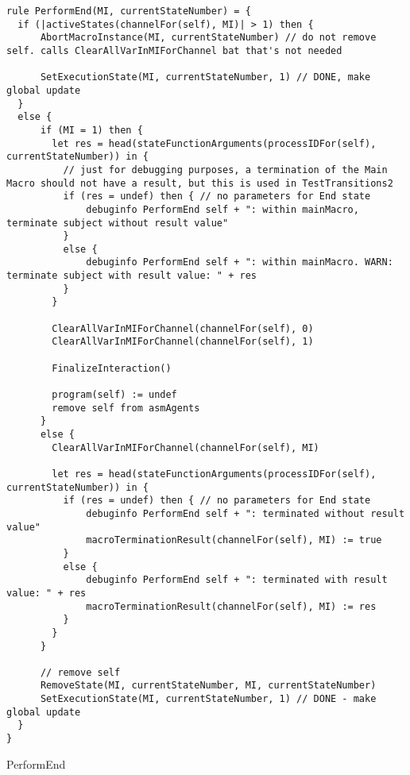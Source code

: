 \begin{listing}[H]
\begin{verbatim}
rule PerformEnd(MI, currentStateNumber) = {
  if (|activeStates(channelFor(self), MI)| > 1) then {
      AbortMacroInstance(MI, currentStateNumber) // do not remove self. calls ClearAllVarInMIForChannel bat that's not needed

      SetExecutionState(MI, currentStateNumber, 1) // DONE, make global update
  }
  else {
      if (MI = 1) then {
        let res = head(stateFunctionArguments(processIDFor(self), currentStateNumber)) in {
          // just for debugging purposes, a termination of the Main Macro should not have a result, but this is used in TestTransitions2
          if (res = undef) then { // no parameters for End state
              debuginfo PerformEnd self + ": within mainMacro, terminate subject without result value"
          }
          else {
              debuginfo PerformEnd self + ": within mainMacro. WARN: terminate subject with result value: " + res
          }
        }

        ClearAllVarInMIForChannel(channelFor(self), 0)
        ClearAllVarInMIForChannel(channelFor(self), 1)

        FinalizeInteraction()

        program(self) := undef
        remove self from asmAgents
      }
      else {
        ClearAllVarInMIForChannel(channelFor(self), MI)

        let res = head(stateFunctionArguments(processIDFor(self), currentStateNumber)) in {
          if (res = undef) then { // no parameters for End state
              debuginfo PerformEnd self + ": terminated without result value"
              macroTerminationResult(channelFor(self), MI) := true
          }
          else {
              debuginfo PerformEnd self + ": terminated with result value: " + res
              macroTerminationResult(channelFor(self), MI) := res
          }
        }
      }

      // remove self
      RemoveState(MI, currentStateNumber, MI, currentStateNumber)
      SetExecutionState(MI, currentStateNumber, 1) // DONE - make global update
  }
}
\end{verbatim}
\caption{PerformEnd}
\label{lst:asm:PerformEnd}
\end{listing}






